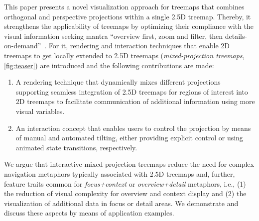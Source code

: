 This paper presents a novel visualization approach for treemaps that combines orthogonal and perspective projections within a single 2.5D treemap.
Thereby, it strengthens the applicability of treemaps by optimizing their compliance with the visual information seeking mantra \enquote{overview first, zoom and filter, then details-on-demand}~\cite{Shneiderman1996}.
For it, rendering and interaction techniques that enable 2D treemaps to get locally extended to 2.5D treemaps (\emph{mixed-projection treemaps}, \autoref{fig:teaser}) are introduced and the following contributions are made:
\begin{enumerate}
    \item A rendering technique that dynamically mixes different projections supporting seamless integration of 2.5D treemaps for regions of interest into 2D treemaps to facilitate communication of additional information using more visual variables.
    \item An interaction concept that enables users to control the projection by means of manual and automated tilting, either providing explicit control or using animated state transitions, respectively.
\end{enumerate}
We argue that interactive mixed-projection treemaps reduce the need for complex navigation metaphors typically associated with 2.5D treemaps and, further, feature traits common for \emph{focus+context} or \emph{overview+detail} metaphors, i.e., (1) the reduction of visual complexity for overview and context display and (2) the visualization of additional data in focus or detail areas. We demonstrate and discuss these aspects by means of application examples. %


